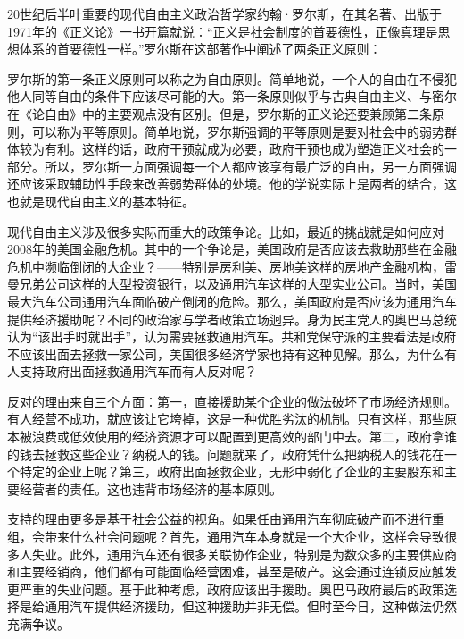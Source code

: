 20世纪后半叶重要的现代自由主义政治哲学家约翰·罗尔斯，在其名著、出版于1971年的《正义论》一书开篇就说：“正义是社会制度的首要德性，正像真理是思想体系的首要德性一样。”罗尔斯在这部著作中阐述了两条正义原则：


罗尔斯的第一条正义原则可以称之为自由原则。简单地说，一个人的自由在不侵犯他人同等自由的条件下应该尽可能的大。第一条原则似乎与古典自由主义、与密尔在《论自由》中的主要观点没有区别。但是，罗尔斯的正义论还要兼顾第二条原则，可以称为平等原则。简单地说，罗尔斯强调的平等原则是要对社会中的弱势群体较为有利。这样的话，政府干预就成为必要，政府干预也成为塑造正义社会的一部分。所以，罗尔斯一方面强调每一个人都应该享有最广泛的自由，另一方面强调还应该采取辅助性手段来改善弱势群体的处境。他的学说实际上是两者的结合，这也就是现代自由主义的基本特征。

现代自由主义涉及很多实际而重大的政策争论。比如，最近的挑战就是如何应对2008年的美国金融危机。其中的一个争论是，美国政府是否应该去救助那些在金融危机中濒临倒闭的大企业？——特别是房利美、房地美这样的房地产金融机构，雷曼兄弟公司这样的大型投资银行，以及通用汽车这样的大型实业公司。当时，美国最大汽车公司通用汽车面临破产倒闭的危险。那么，美国政府是否应该为通用汽车提供经济援助呢？不同的政治家与学者政策立场迥异。身为民主党人的奥巴马总统认为“该出手时就出手”，认为需要拯救通用汽车。共和党保守派的主要看法是政府不应该出面去拯救一家公司，美国很多经济学家也持有这种见解。那么，为什么有人支持政府出面拯救通用汽车而有人反对呢？

反对的理由来自三个方面：第一，直接援助某个企业的做法破坏了市场经济规则。有人经营不成功，就应该让它垮掉，这是一种优胜劣汰的机制。只有这样，那些原本被浪费或低效使用的经济资源才可以配置到更高效的部门中去。第二，政府拿谁的钱去拯救这些企业？纳税人的钱。问题就来了，政府凭什么把纳税人的钱花在一个特定的企业上呢？第三，政府出面拯救企业，无形中弱化了企业的主要股东和主要经营者的责任。这也违背市场经济的基本原则。

支持的理由更多是基于社会公益的视角。如果任由通用汽车彻底破产而不进行重组，会带来什么社会问题呢？首先，通用汽车本身就是一个大企业，这样会导致很多人失业。此外，通用汽车还有很多关联协作企业，特别是为数众多的主要供应商和主要经销商，他们都有可能面临经营困难，甚至是破产。这会通过连锁反应触发更严重的失业问题。基于此种考虑，政府应该出手援助。奥巴马政府最后的政策选择是给通用汽车提供经济援助，但这种援助并非无偿。但时至今日，这种做法仍然充满争议。

